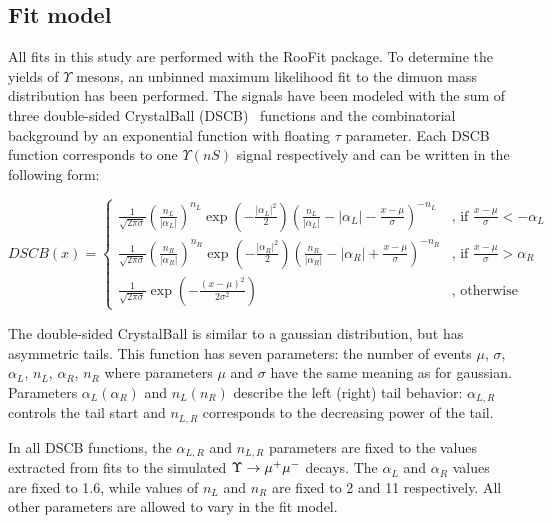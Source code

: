\subsection{Fit model}
\label{sec:upsilon:fit}
All  fits in this study are performed with the RooFit package\cite{roofit}.
To determine the yields of $\Upsilon$ mesons, an unbinned maximum likelihood
fit to the dimuon mass distribution has been performed. The signals have been
modeled with the sum of three double-sided CrystalBall (DSCB)~\cite{Skwarnicki:1986xj} functions and the
combinatorial background by an exponential function with floating $\tau$
parameter. Each DSCB function corresponds to one $\Upsilon(nS)$ signal respectively
and can be written in the following form:

\begin{equation}
DSCB(x) = 
\begin{cases}
\frac{1}{\sqrt{2\pi\sigma}}{(\frac{n_L}{|\alpha_L|})}^{n_L}\exp(-\frac{|\alpha_L|^2}{2}){(\frac{n_L}{|\alpha_L|}-|\alpha_L|-\frac{x-\mu}{\sigma})}^{-n_L} & \text{, if $\frac{x-\mu}{\sigma} < -\alpha_L$}\\
\frac{1}{\sqrt{2\pi\sigma}}{(\frac{n_R}{|\alpha_R|})}^{n_R}\exp(-\frac{|\alpha_R|^2}{2}){(\frac{n_R}{|\alpha_R|}-|\alpha_R|+\frac{x-\mu}{\sigma})}^{-n_R} & \text{, if $\frac{x-\mu}{\sigma} > \alpha_R$}\\
\frac{1}{\sqrt{2\pi\sigma}}\exp(-\frac{{(x-\mu)}^2}{2\sigma^2}) & \text{, otherwise}
\end{cases}
\label{eq:dcb}
\end{equation}

The double-sided CrystalBall is similar to a gaussian
distribution, but has asymmetric tails. This function has seven parameters:
the number of events $\mu$, $\sigma$, $\alpha_L$, $n_L$, $\alpha_R$, $n_R$ where parameters $\mu$
and $\sigma$ have the same meaning as for gaussian. Parameters $\alpha_L
(\alpha_R)$ and $n_L (n_R)$ describe the left (right) tail behavior:
$\alpha_{L,R}$ controls the tail start and $n_{L,R}$ corresponds to the
decreasing power of the tail. 

In all DSCB functions, the  $\alpha_{L,R}$ and $n_{L,R}$ parameters are fixed to the values extracted
from fits to the simulated $\Upsilon \rightarrow \mu^+\mu^-$ decays. The $\alpha_L$ and
$\alpha_R$ values are fixed to 1.6, while values of $n_L$  and $n_R$ are fixed
to 2 and 11 respectively. All other parameters are allowed to vary in the fit model.

